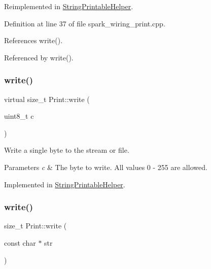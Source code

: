 Reimplemented in \hyperlink{class_string_printable_helper_a8098bfb565b518cec0cf9e6fbc68eed8}{String\+Printable\+Helper}.



Definition at line 37 of file spark\+\_\+wiring\+\_\+print.\+cpp.



References write().



Referenced by write().

\mbox{\label{class_print_ab9195b97274029f693aaddce6c7a0021}} 
\subsubsection{\texorpdfstring{write()}{write()}\hspace{0.1cm}{\footnotesize\ttfamily [4/6]}}
{\footnotesize\ttfamily virtual size\+\_\+t Print\+::write (\begin{DoxyParamCaption}\item[{uint8\+\_\+t}]{c }\end{DoxyParamCaption})\hspace{0.3cm}{\ttfamily [pure virtual]}}



Write a single byte to the stream or file. 


\begin{DoxyParams}{Parameters}
{\em c} & The byte to write. All values 0 -\/ 255 are allowed. \\
\hline
\end{DoxyParams}


Implemented in \hyperlink{class_string_printable_helper_adc5aab11289f917cefa1225b59afde2a}{String\+Printable\+Helper}.

\mbox{\label{class_print_a5b40e0e9cab1f2fe5bb0cb22ffe5adda}} 
\subsubsection{\texorpdfstring{write()}{write()}\hspace{0.1cm}{\footnotesize\ttfamily [5/6]}}
{\footnotesize\ttfamily size\+\_\+t Print\+::write (\begin{DoxyParamCaption}\item[{const char $\ast$}]{str }\end{DoxyParamCaption})\hspace{0.3cm}{\ttfamily [inline]}}



